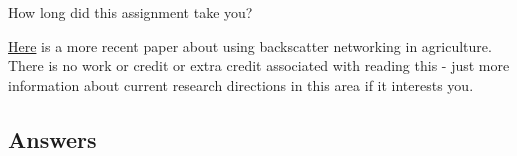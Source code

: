 \documentclass[10pt]{article}
\newenvironment{problem}[2][Problem]{\begin{trivlist}
\item[\hskip \labelsep {\bfseries #1}\hskip \labelsep {\bfseries #2.}]}{\end{trivlist}}
\begin{document}
\begin{problem}{4}
How long did this assignment take you?
\end{problem}
\begin{problem}{5: Extra (optional) reading}
\href{https://www.microsoft.com/en-us/research/uploads/prod/2019/08/Strobe_camera_ready-1.pdf}{Here} is a more recent paper about using backscatter networking in agriculture. There is no work or credit or extra credit associated with reading this - just more information about current research directions in this area if it interests you. 
\end{problem}

\newpage

\subsection*{Answers}
\end{document}
